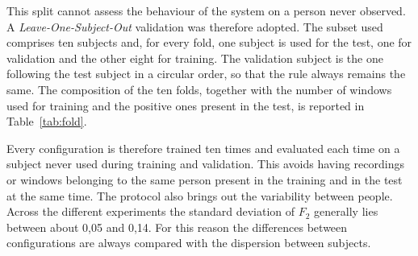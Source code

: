This split cannot assess the behaviour of the system on a person never observed. A \emph{Leave-One-Subject-Out} validation was therefore adopted. The subset used comprises ten subjects and, for every fold, one subject is used for the test, one for validation and the other eight for training. The validation subject is the one following the test subject in a circular order, so that the rule always remains the same. The composition of the ten folds, together with the number of windows used for training and the positive ones present in the test, is reported in Table~\ref{tab:fold}.

\begin{table}[ht]
\centering
\caption{Composition of the ten folds used in the LOSO validation.}
\label{tab:fold}
\end{table}

Every configuration is therefore trained ten times and evaluated each time on a subject never used during training and validation. This avoids having recordings or windows belonging to the same person present in the training and in the test at the same time. The protocol also brings out the variability between people. Across the different experiments the standard deviation of $F_2$ generally lies between about 0,05 and 0,14. For this reason the differences between configurations are always compared with the dispersion between subjects.

